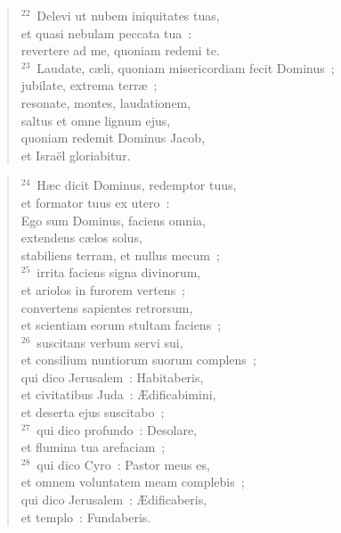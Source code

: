 \begin{verse}
${}^{22}$~Delevi ut nubem iniquitates tuas,\\ et quasi nebulam peccata tua~:\\ revertere ad me, quoniam redemi te.\\
${}^{23}$~Laudate, c\ae li, quoniam misericordiam fecit Dominus~;\\ jubilate, extrema terr\ae~;\\ resonate, montes, laudationem,\\ saltus et omne lignum ejus,\\ quoniam redemit Dominus Jacob,\\ et Isra\"el gloriabitur.\end{verse}


\begin{verse}${}^{24}$~H\ae c dicit Dominus, redemptor tuus,\\ et formator tuus ex utero~:\\ Ego sum Dominus, faciens omnia,\\ extendens c\ae los solus,\\ stabiliens terram, et nullus mecum~;\\
${}^{25}$~irrita faciens signa divinorum,\\ et ariolos in furorem vertens~;\\ convertens sapientes retrorsum,\\ et scientiam eorum stultam faciens~;\\
${}^{26}$~suscitans verbum servi sui,\\ et consilium nuntiorum suorum complens~;\\ qui dico Jerusalem~: Habitaberis,\\ et civitatibus Juda~: \AE dificabimini,\\ et deserta ejus suscitabo~;\\
${}^{27}$~qui dico profundo~: Desolare,\\ et flumina tua arefaciam~;\\
${}^{28}$~qui dico Cyro~: Pastor meus es,\\ et omnem voluntatem meam complebis~;\\ qui dico Jerusalem~: \AE dificaberis,\\ et templo~: Fundaberis.\end{verse}


